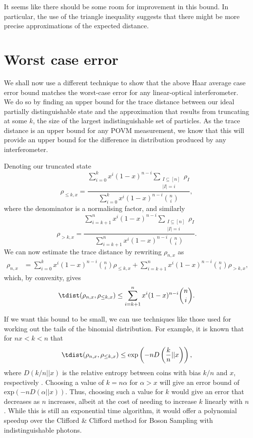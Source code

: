It seems like there should be some room for improvement in this bound. 
In particular, the use of the triangle inequality suggests that there might be more precise approximations of the expected distance.

\section{Worst case error}
\label{sec:worst-case}

We shall now use a different technique to show that the above Haar average case error bound matches the worst-case error for any linear-optical interferometer. We do so by finding an upper bound for the trace distance between our ideal partially distinguishable state and the approximation that results from truncating at some $k$, the size of the largest indistinguishable set of particles.
As the trace distance is an upper bound for any POVM measurement, we know that this will provide an upper bound for the difference in distribution produced by any interferometer.

Denoting our truncated state
\begin{equation}
\rho_{\leq k,x} = \frac{\sum_{i=0}^kx^i(1-x)^{n-i}\sum_{\substack{I\subseteq[n]\\|I|=i}}\rho_I}{\sum_{i=0}^kx^i(1-x)^{n-i}\binom{n}{i}},
\end{equation}
where the denominator is a normalising factor, and similarly
\begin{equation}
\rho_{>k,x} = \frac{\sum_{i=k+1}^nx^i(1-x)^{n-i}\sum_{\substack{I\subseteq[n]\\|I|=i}}\rho_I}{\sum_{i=k+1}^nx^i(1-x)^{n-i}\binom{n}{i}}.
\end{equation}
We can now estimate the trace distance by rewriting $\rho_{n,x}$ as
\begin{align}
\rho_{n,x}
&=\sum_{i=0}^kx^i(1-x)^{n-i}\binom{n}{i} \rho_{\leq k,x} +\sum_{i=k+1}^nx^i(1-x)^{n-i}\binom{n}{i} \rho_{>k,x} ,
\end{align}
which, by convexity, gives
\begin{equation}
\tdist(\rho_{n,x},\rho_{\leq k,x}) \leq \sum_{i=k+1}^nx^i(1-x)^{n-i}\binom{n}{i}\label{eqn:error-sum}.
\end{equation}

If we want this bound to be small, we can use techniques like those used for working out the tails of the binomial distribution. 
For example, it is known that for $nx<k<n$ that
\begin{equation}
\tdist(\rho_{n,x},\rho_{\leq k,x}) \leq \textrm{exp}\left(-nD\left(\frac{k}{n}||x\right)\right),\label{eqn:worst-case}
\end{equation}
where $D(k/n||x)$ is the relative entropy between coins with bias $k/n$ and $x$, respectively \cite{arratia1989}. 
Choosing a value of $k=n\alpha$ for $\alpha>x$ will give an error bound of $\textrm{exp}(-nD(\alpha||x))$. 
Thus, choosing such a value for $k$ would give an error that decreases as $n$ increases, albeit at the cost of needing to increase $k$ linearly with $n$. 
While this is still an exponential time algorithm, it would offer a polynomial speedup over the Clifford \& Clifford method for Boson Sampling with indistinguishable photons.

